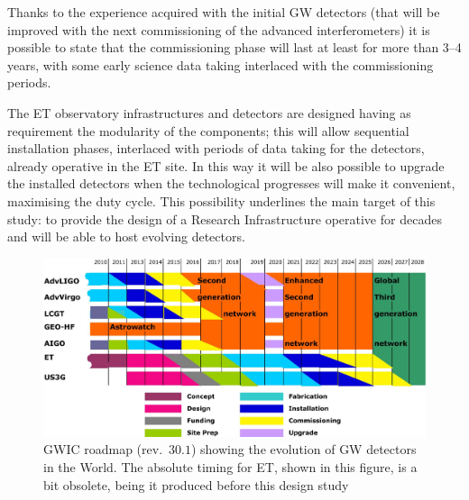 Thanks to the experience acquired with the initial GW detectors (that will be improved with the next commissioning of the advanced interferometers) it is possible to state that the commissioning phase will last at least for more than 3--4 years, with some early science data taking interlaced with the commissioning periods. 
\par 
The ET observatory infrastructures and detectors are designed having as requirement the modularity of the components; this will allow sequential installation phases, interlaced with periods of data taking for the detectors, already operative in the ET site. In this way it will be also possible to upgrade the installed detectors when the technological progresses will make it convenient, maximising the duty cycle. This possibility underlines the main target of this study: to provide the design of a Research Infrastructure operative for decades and will be able to host evolving detectors.
%
\FloatBarrier
\begin{figure}[hthp!]
\includegraphics[width=1.0\textwidth]{Sec_Conclusions/Roadmap_GWIC_rev30_1.jpg}
\caption{GWIC roadmap (rev.~$30.1$) showing the evolution of GW detectors in the World. The absolute timing for ET, shown in this figure, is a bit obsolete, being it produced before this design study}
\label{Fig:Roadmap}       %
\end{figure}
%
%
\FloatBarrier
